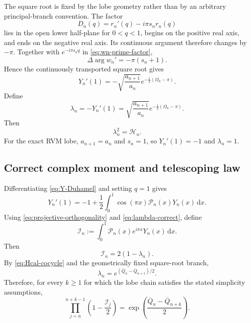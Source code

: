 \documentclass[11pt]{amsart}
\numberwithin{equation}{section}
\theoremstyle{definition}
\theoremstyle{remark}
\newcommand{\dd}{\,\mathrm d}
\newcommand{\Ical}{\mathcal I}
\newcommand{\Hcal}{\mathcal H}
\newcommand{\Pcal}{\mathcal P}
\begin{document}
The square root is fixed by the lobe geometry rather than by an arbitrary principal-branch convention.  The factor
\begin{equation}
D_n(q)=r_n'(q)-i\pi s_nr_n(q)
\label{eq:Dfactor-definition}
\end{equation}
lies in the open lower half-plane for $0<q<1$, begins on the positive real axis, and ends on the negative real axis.  Its continuous argument therefore changes by $-\pi$.  Together with $e^{-i\pi s_nq}$ in \eqref{eq:wn-prime-factor},
\begin{equation}
\Delta\arg w_n'=-\pi(s_n+1).
\label{eq:wprime-argument-change}
\end{equation}
Hence the continuously transported square root gives
\begin{equation}
Y_n'(1)
=-\sqrt{\frac{a_{n+1}}{a_n}}
 e^{-\frac{i}{2}(\Omega_n-\pi)}.
\label{eq:Yprime1-correct}
\end{equation}
Define
\begin{equation}
\lambda_n=-Y_n'(1)
=\sqrt{\frac{a_{n+1}}{a_n}}
 e^{-\frac{i}{2}(\Omega_n-\pi)}.
\label{eq:lambda-correct}
\end{equation}
Then
\begin{equation}
\lambda_n^2=\Hcal_n.
\label{eq:lambda-square}
\end{equation}
For the exact RVM lobe, $a_{n+1}=a_n$ and $s_n=1$, so $Y_n'(1)=-1$ and $\lambda_n=1$.

\subsection{Correct complex moment and telescoping law}
\label{subsec:moment-cocycle}

Differentiating \eqref{eq:Y-Duhamel} and setting $q=1$ gives
\begin{equation}
Y_n'(1)
=-1+\frac12\int_0^1\cos(\pi x)\Pcal_n(x)Y_n(x)\dd x.
\label{eq:Yprime-Duhamel}
\end{equation}
Using \eqref{eq:projective-orthogonality} and \eqref{eq:lambda-correct}, define
\begin{equation}
\Ical_n
:=\int_0^1\Pcal_n(x)e^{i\pi x}Y_n(x)\dd x.
\label{eq:Ical-definition}
\end{equation}
Then
\begin{equation}
\Ical_n=2(1-\lambda_n).
\label{eq:Ical-lambda}
\end{equation}
By \eqref{eq:Hcal-cocycle} and the geometrically fixed square-root branch,
\begin{equation}
\lambda_n
=e^{(\overline Q_n-\overline Q_{n+1})/2}.
\label{eq:lambda-Q}
\end{equation}
Therefore, for every $k\ge1$ for which the lobe chain satisfies the stated simplicity assumptions,
\begin{equation}
\prod_{j=n}^{n+k-1}\left(1-\frac{\Ical_j}{2}\right)
=
\exp\left(\frac{\overline Q_n-\overline Q_{n+k}}{2}\right).
\label{eq:projective-product}
\end{equation}
\end{document}
